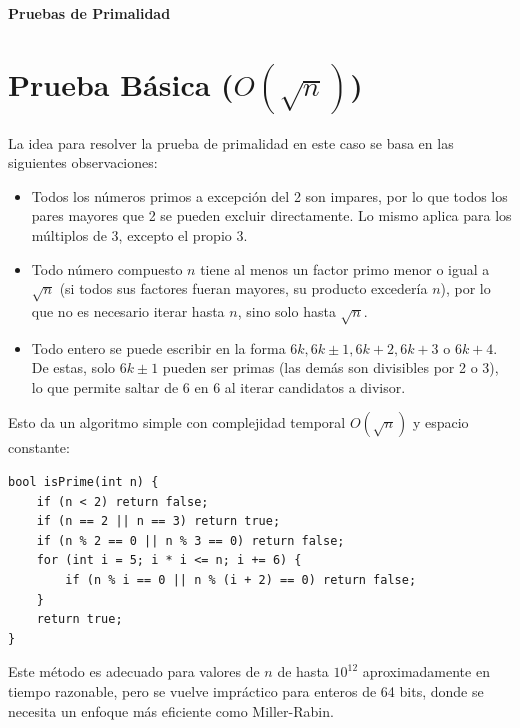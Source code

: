 \documentclass[11pt,a4paper]{article}
\begin{document}
\begin{center}
    \huge \textbf{Pruebas de Primalidad}
    \vspace{0.5cm}
\end{center}

\section*{Prueba Básica ($O(\sqrt{n})$)}
La idea para resolver la prueba de primalidad en este caso se basa en las siguientes observaciones:
\begin{itemize}
    \item Todos los números primos a excepción del 2 son impares, por lo que todos los pares mayores que 2 se pueden excluir directamente. Lo mismo aplica para los múltiplos de 3, excepto el propio 3.
    \item Todo número compuesto $n$ tiene al menos un factor primo menor o igual a $\sqrt{n}$ (si todos sus factores fueran mayores, su producto excedería $n$), por lo que no es necesario iterar hasta $n$, sino solo hasta $\sqrt{n}$.
    \item Todo entero se puede escribir en la forma $6k, 6k\pm1, 6k+2, 6k+3$ o $6k+4$. De estas, solo $6k\pm1$ pueden ser primas (las demás son divisibles por 2 o 3), lo que permite saltar de 6 en 6 al iterar candidatos a divisor.
\end{itemize}
Esto da un algoritmo simple con complejidad temporal $O(\sqrt{n})$ y espacio constante:
\begin{lstlisting}
bool isPrime(int n) {
    if (n < 2) return false;
    if (n == 2 || n == 3) return true;
    if (n % 2 == 0 || n % 3 == 0) return false;
    for (int i = 5; i * i <= n; i += 6) {
        if (n % i == 0 || n % (i + 2) == 0) return false;
    }
    return true;
}
\end{lstlisting}
Este método es adecuado para valores de $n$ de hasta $10^{12}$ aproximadamente en tiempo razonable, pero se vuelve impráctico para enteros de 64 bits, donde se necesita un enfoque más eficiente como Miller-Rabin.
\end{document}
